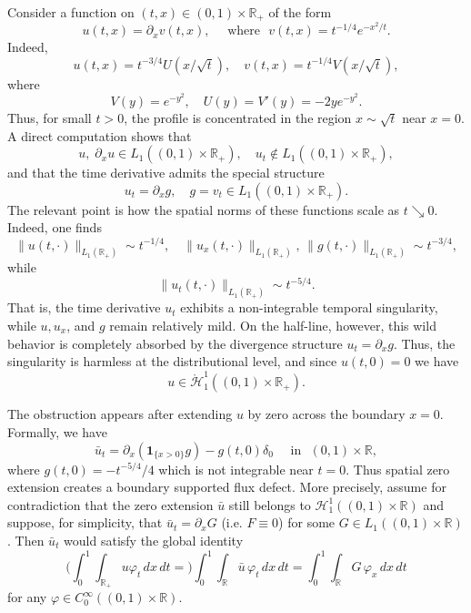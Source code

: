 \documentclass[reqno]{amsart}
\numberwithin{equation}{section}
\theoremstyle{plain}
\theoremstyle{definition}
\def\bR{\mathbb{R}}
\def\cH{\mathcal{H}}
\begin{document}
Consider a function on $(t, x) \in (0,1)\times\bR_+$ of the form
\[
u(t,x)=\partial_x v(t,x), \quad \textrm{ where }\,\,
v(t,x)=t^{-1/4}e^{-x^2/t}.
\]
Indeed,
\[
u(t,x)=t^{-3/4}U(x/\sqrt t), \quad v(t,x)=t^{-1/4}V(x/\sqrt t),
\]
where
\[
V(y)=e^{-y^2}, \quad U(y) = V'(y) = -2y e^{-y^2}.
\]
Thus, for small $t>0$, the profile is concentrated in the region $x \sim \sqrt t$ near $x=0$.
A direct computation shows that
\[
u,\; \partial_x u \in L_1((0,1) \times \bR_+),
\quad
u_t\notin L_1((0,1)\times\bR_+),
\]
and that the time derivative admits the special structure
\[
u_t=\partial_x g,
\quad
g=v_t\in L_1((0,1)\times\bR_+).
\]
The relevant point is how the spatial norms of these functions scale as $t \searrow 0$.
Indeed, one finds
\[
\|u(t, \cdot)\|_{L_1(\bR_+)} \sim t^{-1/4},
\quad
\|u_x(t, \cdot)\|_{L_1(\bR_+)}, \, \|g(t, \cdot)\|_{L_1(\bR_+)} \sim t^{-3/4},
\]
while
\[
\|u_t(t, \cdot)\|_{L_1(\bR_+)} \sim t^{-5/4}.
\]
That is, the time derivative $u_t$ exhibits a non-integrable temporal singularity, while $u, u_x$, and $g$ remain relatively mild.
On the half-line, however, this wild behavior is completely absorbed by the divergence structure $u_t=\partial_x g$.
Thus, the singularity is harmless at the distributional level, and since $u(t, 0) = 0$ we have
\[
u\in \mathring{\cH}^1_1((0,1) \times \bR_+).
\]

The obstruction appears after extending $u$ by zero across the boundary $x=0$.
Formally, we have
\[
\bar{u}_t = \partial_x(\mathbf 1_{\{x>0\}} g)-g(t,0)\delta_0 \quad \textrm{ in } \,\, (0, 1) \times \bR,
\]
where $g(t,0)= -t^{-5/4}/4$ which is not integrable near $t=0$.
Thus spatial zero extension creates a boundary supported flux defect.
More precisely, assume for contradiction that the zero extension $\bar u$ still belongs to $\cH^1_1((0,1)\times\bR)$ and suppose, for simplicity, that $\bar u_t=\partial_x G$ (i.e. $F \equiv 0$) for some $G\in L_{1}((0,1)\times\bR)$.
Then $\bar u_t$ would satisfy the global identity
\begin{equation}
    \label{int_eq_whole}
\bigg( \int_0^1 \int_{\bR_+} u \varphi_t \,dx\,dt  = \bigg)
 \int_0^1 \int_{\bR} \bar u\,\varphi_t\,dx\,dt
=
\int_0^1 \int_{\bR} G\,\varphi_x\,dx\,dt
\end{equation}
for any $\varphi\in C^\infty_0((0,1)\times\bR)$.
\end{document}
